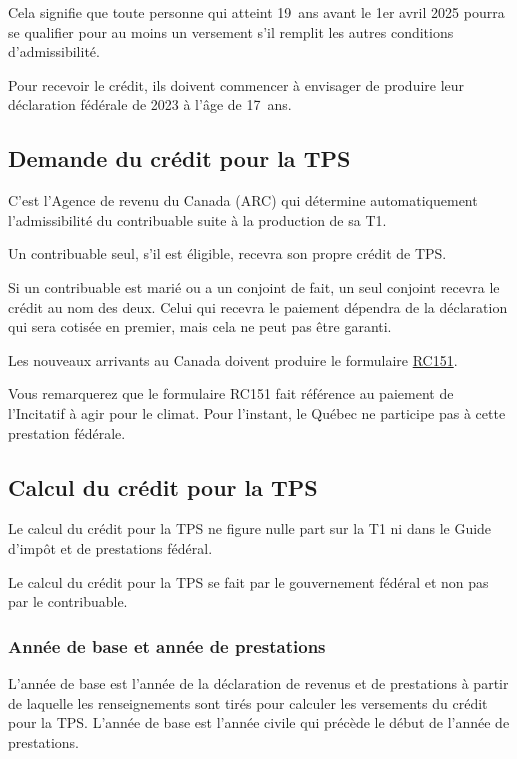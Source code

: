 Cela signifie que toute personne qui atteint 19~ans avant le 1er avril 2025 pourra se qualifier pour au moins un versement s'il remplit les autres conditions d'admissibilité. 

Pour recevoir le crédit, ils doivent commencer à envisager de produire leur déclaration fédérale de 2023 à l'âge de 17~ans.


\subsection{Demande du crédit pour la TPS}
C'est l'Agence de revenu du Canada (ARC) qui détermine automatiquement l'admissibilité du contribuable suite à la production de sa T1.

Un contribuable seul, s'il est éligible, recevra son propre crédit de TPS.

Si un contribuable est marié ou a un conjoint de fait, un seul conjoint recevra le crédit au nom des deux. Celui qui recevra le paiement dépendra de la déclaration qui sera cotisée en premier, mais cela ne peut pas être garanti.

Les nouveaux arrivants au Canada doivent produire le formulaire \href{https://www.canada.ca/fr/agence-revenu/services/formulaires-publications/formulaires/rc151.html}{RC151}.

\begin{note}
	Vous remarquerez que le formulaire RC151 fait référence au paiement de l'Incitatif à agir pour le climat. Pour l'instant, le Québec ne participe pas à cette prestation fédérale.
\end{note}


\subsection{Calcul du crédit pour la TPS}
Le calcul du crédit pour la TPS ne figure nulle part sur la T1 ni dans le Guide d'impôt et de prestations fédéral. 

Le calcul du crédit pour la TPS se fait par le gouvernement fédéral et non pas par le contribuable.

\subsubsection{Année de base et année de prestations}
L'année de base est l'année de la déclaration de revenus et de prestations à partir de laquelle les renseignements sont tirés pour calculer les versements du crédit pour la TPS. L'année de base est l'année civile qui précède le début de l'année de prestations.

